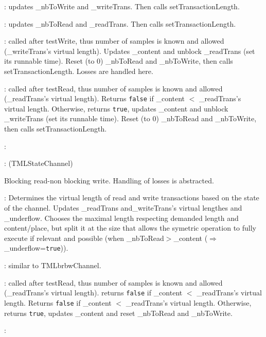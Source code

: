 \documentclass[a4paper,11pt]{article}
\newcommand{\bfont}{\fontseries{b}\selectfont}
\newcommand{\cod}[1]{{\ttfamily #1}}
\newcommand{\class}[2]{\par\vspace{1mm}\hspace{-5mm}\large\colorbox{file}{\textbullet\bfont\cod{#1}:} (\cod{#2})\par}
\newcommand{\method}[1]{\par\vspace{1mm}\hspace{-2mm}\colorbox{method}{\textopenbullet\bfont\cod{#1}:}}
\begin{document}
\method{testWrite(iTrans)} updates \cod{\_nbToWrite} and \cod{\_writeTrans}. Then calls \cod{setTransac\-tion\-Length}.

\method{testRead(iTrans)} updates \cod{\_nbToRead} and \cod{\_readTrans}. Then calls \cod{setTransaction\-Length}.

\method{write()} called after \cod{testWrite}, thus number of samples is known and allowed (\cod{\_wri\-te\-Trans}'s virtual length). Updates \cod{\_content} and unblock \cod{\_readTrans} (set its runnable time). Reset (to 0) \cod{\_nbToRead} and \cod{\_nbToWrite}, then calls \cod{setTransactionLength}. Losses are handled here.
\method{read()} called after \cod{testRead}, thus number of samples is known and allowed (\cod{\_read\-Trans}'s virtual length). Returns {\tt false} if \cod{\_content} $<$ \cod{\_readTrans}'s virtual length. Otherwise, returns {\tt true}, updates  \cod{\_content} and unblock \cod{\_writeTrans} (set its runnable time). Reset (to 0) \cod{\_nbToRead} and \cod{\_nbToWrite}, then calls \cod{setTransactionLength}.
\method{getBlockedReadTask(),getBlockedWriteTask()}
\class{TMLbrnbwChannel}{TMLStateChannel}
Blocking read-non blocking write. Handling of losses is abstracted.
\method{setTransactionLength()} Determines the virtual length of read and write transactions based on the state of the channel. Updates \cod{\_readTrans} and\cod{\_writeTrans}'s virtual lengthes and \cod{\_underflow}. Chooses the maximal length respecting demanded length and content/place, but split it at the size that allows the symetric operation to fully execute if relevant and possible (when \cod{\_nbToRead}$>${\_content} ($\Rightarrow$ \cod{\_underflow}={\tt true})).

\method{testWrite(iTrans), testRead(iTrans), write()} similar to \cod{TMLbrbwChannel}.

\method{read()} called after \cod{testRead}, thus number of samples is known and allowed (\cod{\_read\-Trans}'s virtual length). returns {\tt false} if \cod{\_content} $<$ \cod{\_readTrans}'s virtual length. Returns {\tt false} if \cod{\_content} $<$ \cod{\_readTrans}'s virtual length. Otherwise, returns {\tt true}, updates  \cod{\_content} and reset \cod{\_nbToRead} and \cod{\_nbToWrite}.
\method{getBlockedReadTask(),getBlockedWriteTask()}
\end{document}
